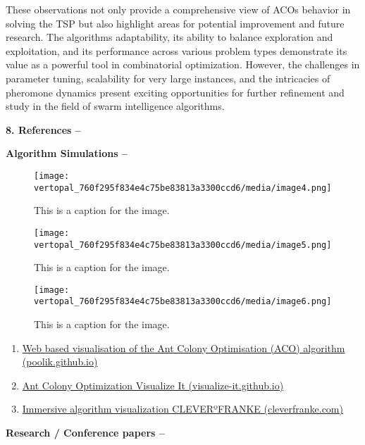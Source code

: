 \documentclass[
]{article}
\begin{document}
These observations not only provide a comprehensive view of
ACO\textquotesingle s behavior in solving the TSP but also highlight
areas for potential improvement and future research. The
algorithm\textquotesingle s adaptability, its ability to balance
exploration and exploitation, and its performance across various problem
types demonstrate its value as a powerful tool in combinatorial
optimization. However, the challenges in parameter tuning, scalability
for very large instances, and the intricacies of pheromone dynamics
present exciting opportunities for further refinement and study in the
field of swarm intelligence algorithms.

\textbf{8. References --}

\textbf{Algorithm Simulations --}

\begin{figure}[htbp]
\centering
\texttt{[image: vertopal\_760f295f834e4c75be83813a3300ccd6/media/image4.png]}
\caption{This is a caption for the image. \label{fig:my_label}}
\end{figure}

\begin{figure}[htbp]
\centering
\texttt{[image: vertopal\_760f295f834e4c75be83813a3300ccd6/media/image5.png]}
\caption{This is a caption for the image. \label{fig:my_label}}
\end{figure}

\begin{figure}[htbp]
\centering
\texttt{[image: vertopal\_760f295f834e4c75be83813a3300ccd6/media/image6.png]}
\caption{This is a caption for the image. \label{fig:my_label}}
\end{figure}

\begin{enumerate}
\item \href{https://poolik.github.io/visual-aco/\#/visualisation}{Web based visualisation of the Ant Colony Optimisation (ACO) algorithm (poolik.github.io)}
\item \href{https://visualize-it.github.io/ant_colony_optimization/simulation.html}{Ant Colony Optimization \textbar{} Visualize It (visualize-it.github.io)}
\item \href{https://www.cleverfranke.com/project/chicago-a.i.-ant-colony}{Immersive algorithm visualization \textbar{} CLEVERºFRANKE (cleverfranke.com)}
\end{enumerate}

\textbf{Research / Conference papers --}
\end{document}

